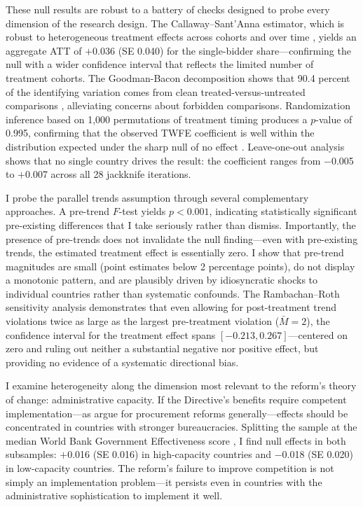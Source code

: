 \documentclass[12pt]{article}
\begin{document}
These null results are robust to a battery of checks designed to probe every dimension of the research design. The Callaway--Sant'Anna estimator, which is robust to heterogeneous treatment effects across cohorts and over time \citep{callaway2021difference}, yields an aggregate ATT of $+$0.036 (SE 0.040) for the single-bidder share---confirming the null with a wider confidence interval that reflects the limited number of treatment cohorts. The Goodman-Bacon decomposition shows that 90.4 percent of the identifying variation comes from clean treated-versus-untreated comparisons \citep{goodmanbacon2021}, alleviating concerns about forbidden comparisons. Randomization inference based on 1,000 permutations of treatment timing produces a $p$-value of 0.995, confirming that the observed TWFE coefficient is well within the distribution expected under the sharp null of no effect \citep{fisher1935}. Leave-one-out analysis shows that no single country drives the result: the coefficient ranges from $-$0.005 to $+$0.007 across all 28 jackknife iterations.

I probe the parallel trends assumption through several complementary approaches. A pre-trend $F$-test yields $p < 0.001$, indicating statistically significant pre-existing differences that I take seriously rather than dismiss. Importantly, the presence of pre-trends does not invalidate the null finding---even with pre-existing trends, the estimated treatment effect is essentially zero. I show that pre-trend magnitudes are small (point estimates below 2 percentage points), do not display a monotonic pattern, and are plausibly driven by idiosyncratic shocks to individual countries rather than systematic confounds. The Rambachan--Roth sensitivity analysis \citep{rambachanRoth2023} demonstrates that even allowing for post-treatment trend violations twice as large as the largest pre-treatment violation ($\bar{M} = 2$), the confidence interval for the treatment effect spans $[-0.213, 0.267]$---centered on zero and ruling out neither a substantial negative nor positive effect, but providing no evidence of a systematic directional bias.

I examine heterogeneity along the dimension most relevant to the reform's theory of change: administrative capacity. If the Directive's benefits require competent implementation---as \citet{bosio2022} argue for procurement reforms generally---effects should be concentrated in countries with stronger bureaucracies. Splitting the sample at the median World Bank Government Effectiveness score \citep{kaufmann2011}, I find null effects in both subsamples: $+$0.016 (SE 0.016) in high-capacity countries and $-$0.018 (SE 0.020) in low-capacity countries. The reform's failure to improve competition is not simply an implementation problem---it persists even in countries with the administrative sophistication to implement it well.
\end{document}
